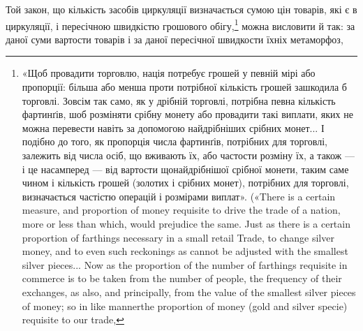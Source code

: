 Той закон, що кількість засобів циркуляції визначається
сумою цін товарів, які є в циркуляції, і пересічною швидкістю
грошового обігу,\footnote{
«Щоб провадити торговлю, нація потребує грошей у певній мірі
або пропорції: більша або менша проти потрібної кількість грошей зашкодила
б торговлі. Зовсім так само, як у дрібній торговлі, потрібна певна
кількість фартинґів, шоб розміняти срібну монету або провадити такі
виплати, яких не можна перевести навіть за допомогою найдрібніших
срібних монет... І подібно до того, як пропорція числа фартинґів, потрібних
для торговлі, залежить від числа осіб, що вживають їх, або частости
розміну їх, а також — і це насамперед — від вартости щонайдрібнішої
срібної монети, таким саме чином і кількість грошей (золотих і срібних
монет), потрібних для торговлі, визначається частістю операцій і розмірами
виплат». («There is a certain measure, and proportion of money requisite
to drive the trade of a nation, more or less than which, would prejudice
the same. Just as there is a certain proportion of farthings necessary in a
small retail Trade, to change silver money, and to even such reckonings
as cannot be adjusted with the smallest silver pieces... Now as the proportion
of the number of farthings requisite in commerce is to be taken from
the number of people, the frequency of their exchanges, as also, and principally,
from the value of the smallest silver pieces of money; so in like mannerthe
proportion of money (gold and silver specie) requisite to our trade,
} можна висловити й так: за даної суми вартости
товарів і за даної пересічної швидкости їхніх метаморфоз,